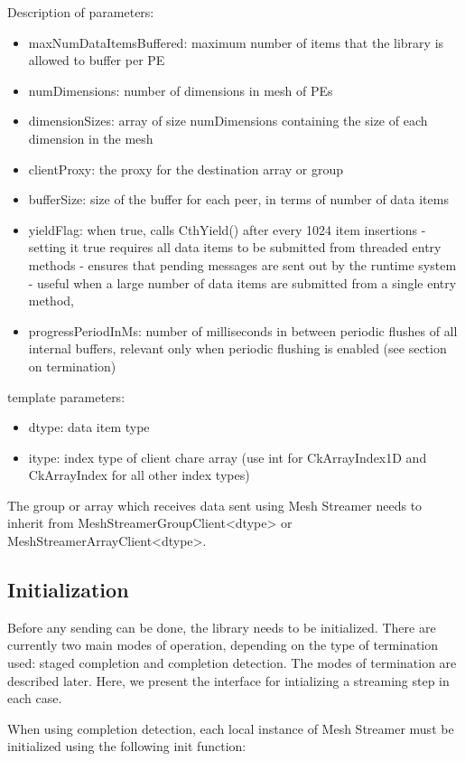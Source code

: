 Description of parameters:
\begin{itemize}
\item maxNumDataItemsBuffered: maximum number of items that the
  library is allowed to buffer per PE 
\item numDimensions: number of dimensions in mesh of PEs
\item dimensionSizes: array of size numDimensions containing the size
  of each dimension in the mesh
\item clientProxy: the proxy for the destination array or group
\item bufferSize: size of the buffer for each peer,
  in terms of number of data items
\item yieldFlag: when true, calls CthYield() after every 1024 item
  insertions - setting it true requires all data items to be submitted
  from threaded entry methods - ensures that pending messages are sent
  out by the runtime system - useful when a large number of data items
  are submitted from a single entry method,
\item progressPeriodInMs: number of milliseconds in between periodic
  flushes of all internal buffers, relevant only when periodic
  flushing is enabled (see section on termination)
\end{itemize}

template parameters:
\begin{itemize}
\item dtype: data item type
\item itype: index type of client chare array (use int for
  CkArrayIndex1D and CkArrayIndex for all other index types)
\end{itemize}

The group or array which receives data sent using Mesh Streamer needs
to inherit from MeshStreamerGroupClient<dtype> or
MeshStreamerArrayClient<dtype>.

\subsection{Initialization}

Before any sending can be done, the library needs to be
initialized. There are currently two main modes of operation,
depending on the type of termination used: staged completion and
completion detection. The modes of termination are described
later. Here, we present the interface for intializing a streaming step
in each case.

When using completion detection, each local instance of Mesh Streamer
must be initialized using the following init function:

